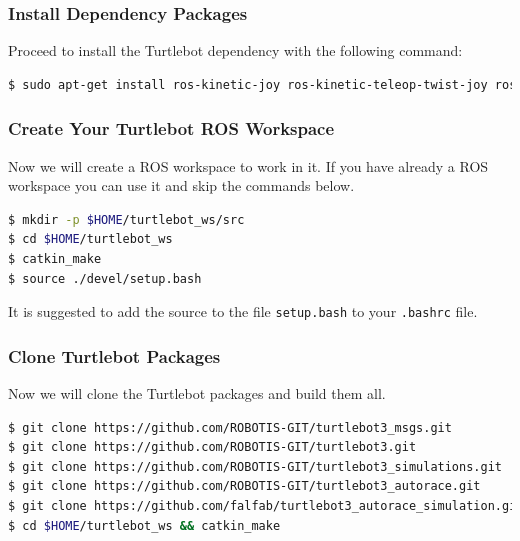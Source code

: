
\begin{frame}[fragile]
	\frametitle{Install Dependency Packages}
	Proceed to install the Turtlebot dependency with the following command:
	\begin{lstlisting}[language=bash]
$ sudo apt-get install ros-kinetic-joy ros-kinetic-teleop-twist-joy ros-kinetic-teleop-twist-keyboard ros-kinetic-laser-proc ros-kinetic-rgbd-launch ros-kinetic-depthimage-to-laserscan ros-kinetic-rosserial-arduino ros-kinetic-rosserial-python ros-kinetic-rosserial-server ros-kinetic-rosserial-client ros-kinetic-rosserial-msgs ros-kinetic-amcl ros-kinetic-map-server ros-kinetic-move-base ros-kinetic-urdf ros-kinetic-xacro ros-kinetic-compressed-image-transport ros-kinetic-rqt-image-view ros-kinetic-gmapping ros-kinetic-navigation ros-kinetic-interactive-markers
	\end{lstlisting}
\end{frame}


\begin{frame}[fragile]
	\frametitle{Create Your Turtlebot ROS Workspace}
	Now we will create a ROS workspace to work in it. If you have already a ROS workspace you can use it and skip the commands below.
\begin{lstlisting}[language=bash]
$ mkdir -p $HOME/turtlebot_ws/src
$ cd $HOME/turtlebot_ws
$ catkin_make
$ source ./devel/setup.bash
\end{lstlisting}
It is suggested to add the source to the file \verb$setup.bash$ to your \verb$.bashrc$ file.
\end{frame}


\begin{frame}[fragile]
	\frametitle{Clone Turtlebot Packages}
Now we will clone the Turtlebot packages and build them all.

\begin{lstlisting}[language=bash]
$ git clone https://github.com/ROBOTIS-GIT/turtlebot3_msgs.git
$ git clone https://github.com/ROBOTIS-GIT/turtlebot3.git
$ git clone https://github.com/ROBOTIS-GIT/turtlebot3_simulations.git
$ git clone https://github.com/ROBOTIS-GIT/turtlebot3_autorace.git
$ git clone https://github.com/falfab/turtlebot3_autorace_simulation.git
$ cd $HOME/turtlebot_ws && catkin_make
\end{lstlisting}
\end{frame}

